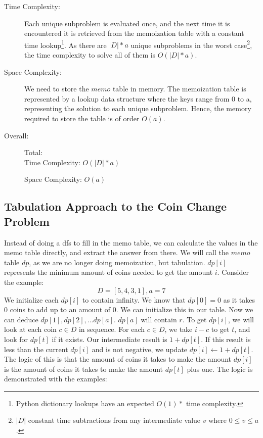\begin{description}
    \item[Time Complexity:]
        Each unique subproblem is evaluated once, and the next time it is encountered it is retrieved from the memoization table with a constant time lookup\footnote{Python dictionary lookups have an expected $O(1)*$ time complexity.}.
        As there are $|D| * a$ unique subproblems in the worst case\footnote{$|D|$ constant time subtractions from any intermediate value $v$ where $0 \leq v \leq a$.}, the time complexity to solve all of them is $O(|D| * a)$.
    
        
    \item[Space Complexity:] 
        We need to store the $memo$ table in memory.
        The memoization table is represented by a lookup data structure where the keys range from 0 to a,
        representing the solution to each unique subproblem.
        Hence, the memory required to store the table is of order $O(a)$.
        
    \item[Overall:] Total:\\
        Time Complexity: $O(|D| * a)$

        Space Complexity: $O(a)$
        
\end{description}

\subsection{Tabulation Approach to the Coin Change Problem}

Instead of doing a dfs to fill in the memo table, we can calculate the values in the memo table directly, and extract the answer from there.
We will call the $memo$ table $dp$, as we are no longer doing memoization, but tabulation.
$dp[i]$ represents the minimum amount of coins needed to get the amount $i$.
Consider the example:$$D = [5,4,3,1], a = 7$$
We initialize each $dp[i]$ to contain infinity.
We know that $dp[0] = 0$ as it takes $0$ coins to add up to an amount of $0$. We can initialize this in our table.
Now we can deduce $dp[1], dp[2], ... dp[a]$. $dp[a]$ will contain $r$.
To get $dp[i]$, we will look at each coin $c \in D$ in sequence.
For each $c \in D$, we take $i - c$ to get $t$, and look for $dp[t]$ if it exists.
Our intermediate result is $1 + dp[t]$.
If this result is less than the current $dp[i]$ and is not negative, we update $dp[i] \leftarrow 1 + dp[t]$.\\
The logic of this is that the amount of coins it takes to make the amount $dp[i]$ is the amount of coins it takes to make the amount $dp[t]$ plus one.
The logic is demonstrated with the examples:

